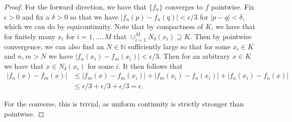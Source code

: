 \documentclass[leqno]{article}
\theoremstyle{nonumberplain}
\newtheorem{proof}{Proof}
\newcommand{\N}{\mathbb{N}}
\begin{document}
\begin{proof}
For the forward direction, we have that $\{f_n\}$ converges to $f$ pointwise.  Fix $\epsilon >0$ and fix a $\delta>0$ so that we have $|f_n(p)-f_n(q)|<\epsilon/3$ for $|p-q|<\delta$, which we can do by equicontinuity.  Note that by compactness of $K$, we have that for finitely many $x_i$ for $i=1,...,M$ that $\cup_{i=1}^M N_\delta (x_i)\supseteq K$.  Then by pointwise convergence, we can also find an $N\in \N$ sufficiently large so that for some $x_i\in K$ and $n,m>N$ we have $|f_n(x_i)-f_m(x_i)|<\epsilon/3$.  Then for an arbitrary $x\in K$ we have that $x\in N_\delta (x_i)$ for some $i$. It then follows that
\begin{align*}
|f_n(x)-f_m(x)|&\leq |f_m(x)-f_m(x_i)|+|f_m(x_i)-f_n(x_i)|+|f_n(x_i)-f_n(x)|\\
&\leq \epsilon/3+\epsilon/3 +\epsilon/3 = \epsilon.
\end{align*}


\noindent For the converse, this is trivial, as uniform continuity is strictly stronger than pointwise.
\end{proof}
\end{document}
